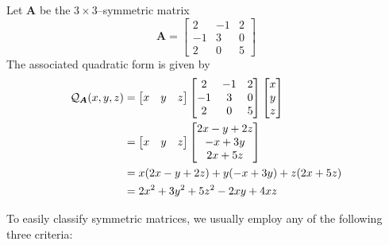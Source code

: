 \begin{example}\label{example:quadraticFromMatrix}
Let $\boldsymbol{A}$ be the $3\times 3$--symmetric matrix
\begin{equation*}
\boldsymbol{A} = \begin{bmatrix} 2 & -1 & 2 \\ -1 & 3 & 0 \\ 2 & 0 & 5 \end{bmatrix}
\end{equation*}
The associated quadratic form is given by
\begin{align*}
\mathcal{Q}_{\boldsymbol{A}}(x,y,z) &= \begin{bmatrix} x & y & z \end{bmatrix} \begin{bmatrix} 2 & -1 & 2 \\ -1 & 3 & 0 \\ 2 & 0 & 5 \end{bmatrix} \begin{bmatrix} x \\ y \\ z \end{bmatrix} \\
&= \begin{bmatrix} x & y & z \end{bmatrix} \begin{bmatrix} 2x -y +2z \\ -x+3y \\ 2x+5z \end{bmatrix} \\
&= x(2x-y+2z) + y(-x+3y) + z(2x+5z) \\
&= 2x^2 +3y^2 + 5z^2 -2xy +4xz
\end{align*}
\end{example}

\separator 

To easily classify symmetric matrices, we usually employ any of the following three criteria:

